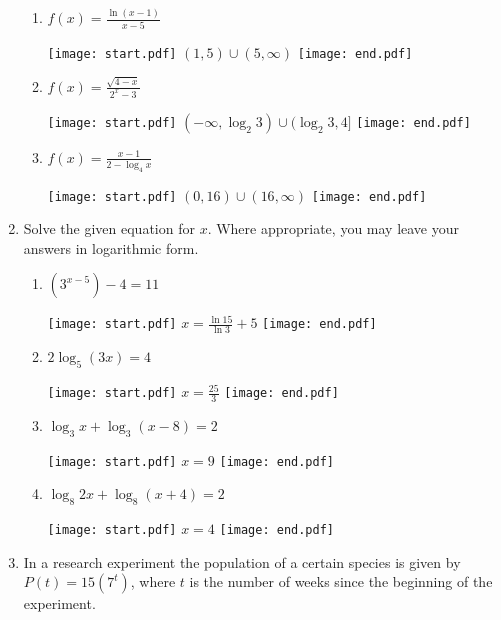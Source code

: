 \documentclass[12pt]{article}
\begin{document}
\begin{enumerate}
\begin{enumerate}

\item $f(x)=\frac{\ln{(x-1)}}{x-5}$

\texttt{[image: start.pdf]}
{{ $(1,5)\cup(5,\infty)$}}
\texttt{[image: end.pdf]}


\item $f(x)=\frac{\sqrt{4-x}}{2^x-3}$

\texttt{[image: start.pdf]}
{{ $(-\infty,\log_2{3})\cup(\log_2{3},4]$}}
\texttt{[image: end.pdf]}


\item $f(x)=\frac{x-1}{2-\log_4{x}}$

\texttt{[image: start.pdf]}
{{ $(0,16)\cup(16,\infty)$}}
\texttt{[image: end.pdf]}


\end{enumerate}

\item Solve the given equation for $x$.  Where appropriate, you may leave your answers in logarithmic form.

\begin{enumerate}

\item $\displaystyle \left(3^{x-5}\right)-4=11$

\texttt{[image: start.pdf]}
{$\displaystyle x=\frac{\ln{15}}{\ln{3}}+5$}
\texttt{[image: end.pdf]}


\item $\displaystyle 2\log_{5}{(3x)}=4$

\texttt{[image: start.pdf]}
{$\displaystyle x=\frac{25}{3}$}
\texttt{[image: end.pdf]}


\item $\displaystyle \log_{3}{x}+\log_{3}{(x-8)}=2$

\texttt{[image: start.pdf]}
{$x=9$}
\texttt{[image: end.pdf]}


\item $\displaystyle \log_{8}{2x}+\log_{8}{(x+4)}=2$

\texttt{[image: start.pdf]}
{$x=4$}
\texttt{[image: end.pdf]}


\end{enumerate}

\item In a research experiment the population of a certain species is given by $P(t)=15(7^t)$, where $t$ is the number of weeks since the beginning of the experiment.


\end{enumerate}
\end{document}
